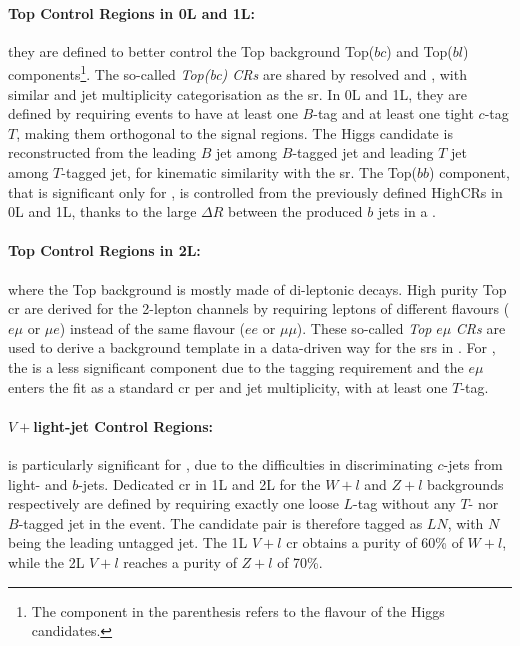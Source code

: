 \paragraph{Top Control Regions in 0L and 1L:} they are defined to better control the Top background Top($bc$) and Top($bl$) components\footnote{The component in the parenthesis refers to the flavour of the Higgs candidates.}. The so-called \textit{Top(bc) CRs} are shared by resolved \vhb and \vhc, with similar \ptv and jet multiplicity categorisation as the \gls{sr}. In 0L and 1L, they are defined by requiring events to have at least one $B$-tag and at least one tight $c$-tag $T$, making them orthogonal to the signal regions. The Higgs candidate is reconstructed from the leading $B$ jet among $B$-tagged jet and leading $T$ jet among $T$-tagged jet, for kinematic similarity with the \gls{sr}. The Top($bb$) component, that is significant only for \vhb, is controlled from the previously defined HighCRs in 0L and 1L, thanks to the large $\Delta R$ between the produced $b$ jets in a \ttb. 

\paragraph{Top Control Regions in 2L:} where the Top background is mostly made of di-leptonic \ttb decays. High purity Top \gls{cr} are derived for the 2-lepton channels by requiring leptons of different flavours ($e\mu$ or $\mu e$) instead of the same flavour ($ee$ or $\mu\mu$). These so-called \textit{Top} $e\mu$ \textit{CRs} are used to derive a \ttb background template in a data-driven way for the \gls{sr}s in \vhb. For \vhc, the \ttb is a less significant component due to the tagging requirement and the $e\mu$ enters the fit as a standard \gls{cr} per \ptv and jet multiplicity, with at least one $T$-tag.

\paragraph{$V +$light-jet Control Regions:} is particularly significant for \vhc, due to the difficulties in discriminating $c$-jets from light- and $b$-jets. Dedicated \gls{cr} in 1L and 2L for the $W+l$ and $Z+l$ backgrounds respectively are defined by requiring exactly one loose $L$-tag without any $T$- nor $B$-tagged jet in the event. The candidate pair is therefore tagged as $LN$, with $N$ being the leading untagged jet. The 1L $V+l$ \gls{cr} obtains a purity of 60\% of $W+l$, while the 2L $V+l$ reaches a purity of $Z+l$ of 70\%.

